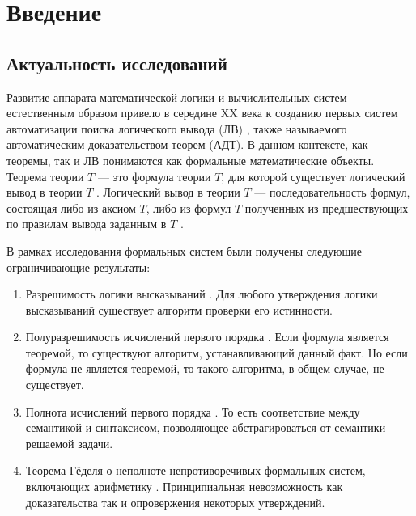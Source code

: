 \chapter*{Введение}

\section*{Актуальность исследований}
Развитие аппарата математической логики и вычислительных систем естественным образом привело в середине XX века к созданию первых систем автоматизации поиска логического вывода (ЛВ) \cite{Newell1, Newell2, WangHao}, также называемого автоматическим доказательством теорем (АДТ). В данном контексте, как теоремы, так и ЛВ понимаются как формальные математические объекты. Теорема теории $T$ --- это формула теории $T$, для которой существует логический вывод в теории $T$ \cite{mendelson}. Логический вывод в теории $T$ --- последовательность формул, состоящая либо из аксиом $T$, либо из формул $T$ полученных из предшествующих по правилам вывода заданным в $T$ \cite{mendelson}.

В рамках исследования формальных систем были получены следующие ограничивающие результаты:
\begin{enumerate}
\item Разрешимость логики высказываний \cite{mendelson}. Для любого утверждения логики высказываний существует алгоритм проверки его истинности.
\item Полуразрешимость исчислений первого порядка \cite{turing}. Если формула является теоремой, то существуют алгоритм, устанавливающий данный факт. Но если формула не является теоремой, то такого алгоритма, в общем случае, не существует.
\item Полнота исчислений первого порядка \cite{Godel1}. То есть соответствие между семантикой и синтаксисом, позволяющее абстрагироваться от семантики решаемой задачи.
\item Теорема Гёделя о неполноте непротиворечивых формальных систем, включающих арифметику \cite{Godel2}. Принципиальная невозможность как доказательства так и опровержения некоторых утверждений.
\end{enumerate}


